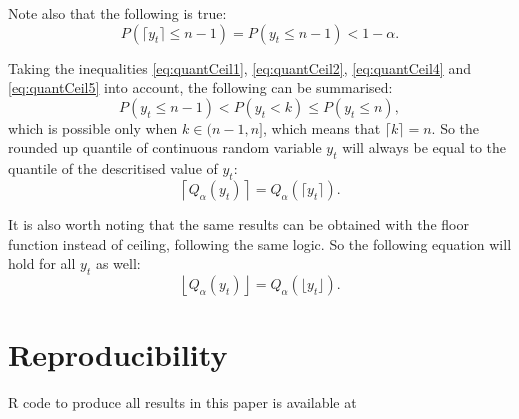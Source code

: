 \documentclass[]{elsarticle} %
\begin{document}
Note also that the following is true:
\begin{equation} \label{eq:quantCeil5}
    P \left(\lceil y_t \rceil \leq n-1 \right) = P \left(y_t \leq n-1 \right) < 1 - \alpha .
\end{equation}

Taking the inequalities \eqref{eq:quantCeil1}, \eqref{eq:quantCeil2},
\eqref{eq:quantCeil4} and \eqref{eq:quantCeil5} into account, the
following can be summarised: \begin{equation} \label{eq:quantCeil6}
    P \left(y_t \leq n-1 \right) < P \left(y_t < k \right) \leq P \left(y_t \leq n \right) ,
\end{equation} which is possible only when \(k \in (n-1, n]\), which means
that \(\lceil k \rceil = n\). So the rounded up quantile of continuous
random variable \(y_t\) will always be equal to the quantile of the
descritised value of \(y_t\):
\begin{equation} \label{eq:ceilingAndQuantiles1}
    \left \lceil Q_\alpha(y_t) \right \rceil = Q_\alpha \left(\lceil y_t \rceil \right) .
\end{equation}

It is also worth noting that the same results can be obtained with the
floor function instead of ceiling, following the same logic. So the
following equation will hold for all \(y_t\) as well:
\begin{equation} \label{eq:floorAndQuantiles1}
    \left \lfloor Q_\alpha(y_t) \right \rfloor = Q_\alpha \left(\lfloor y_t \rfloor \right) .
\end{equation}

\hypertarget{reproducibility}{%
\section*{Reproducibility}\label{reproducibility}}

R code to produce all results in this paper is available at

\renewcommand\refname{References}

\end{document}
